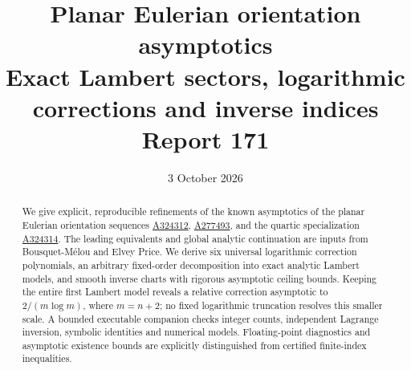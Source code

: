 \documentclass[11pt]{article}
\title{\textbf{Planar Eulerian orientation asymptotics}\\[0.5em]
\large Exact Lambert sectors, logarithmic corrections and inverse indices\\[0.6em]\normalsize Report 171}
\author{}
\date{3 October 2026}
\numberwithin{equation}{section}
\theoremstyle{remark}\newtheorem{remark}[theorem]{Remark}
\begin{document}
\maketitle
\begin{abstract}
We give explicit, reproducible refinements of the known asymptotics of the planar Eulerian orientation sequences \href{https://oeis.org/A324312}{A324312}, \href{https://oeis.org/A277493}{A277493}, and the quartic specialization \href{https://oeis.org/A324314}{A324314}. The leading equivalents and global analytic continuation are inputs from Bousquet-M\'elou and Elvey Price. We derive six universal logarithmic correction polynomials, an arbitrary fixed-order decomposition into exact analytic Lambert models, and smooth inverse charts with rigorous asymptotic ceiling bounds. Keeping the entire first Lambert model reveals a relative correction asymptotic to $2/(m\log m)$, where $m=n+2$; no fixed logarithmic truncation resolves this smaller scale. A bounded executable companion checks integer counts, independent Lagrange inversion, symbolic identities and numerical models. Floating-point diagnostics and asymptotic existence bounds are explicitly distinguished from certified finite-index inequalities.
\end{abstract}
\end{document}
